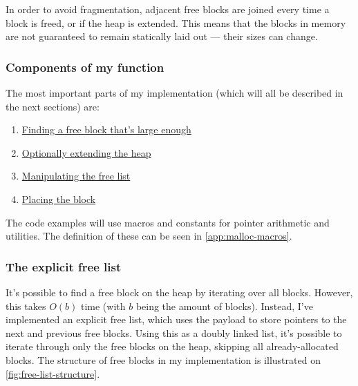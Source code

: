 In order to avoid fragmentation, adjacent free blocks are joined every time a block is freed, or if the heap is extended. This means that the blocks in memory are not guaranteed to remain statically laid out --- their sizes can change.

\subsubsection{Components of my  function}

The most important parts of my  implementation (which will all be described in the next sections) are:

\begin{enumerate}
  \item \hyperref[sec:find-fit]{Finding a free block that's large enough}
  \item \hyperref[sec:extend-heap]{Optionally extending the heap}
  \item \hyperref[sec:manipulate-free-list]{Manipulating the free list}
  \item \hyperref[sec:place-block]{Placing the block}
\end{enumerate}

The code examples will use macros and constants for pointer arithmetic and utilities. The definition of these can be seen in \autoref{app:malloc-macros}.

\subsubsection{The explicit free list}
\label{sec:free-list}

It's possible to find a free block on the heap by iterating over all blocks. However, this takes $O(b)$ time (with $b$ being the amount of blocks). Instead, I've implemented an explicit free list, which uses the payload to store pointers to the next and previous free blocks. Using this as a doubly linked list, it's possible to iterate through only the free blocks on the heap, skipping all already-allocated blocks. The structure of free blocks in my implementation is illustrated on \autoref{fig:free-list-structure}.

